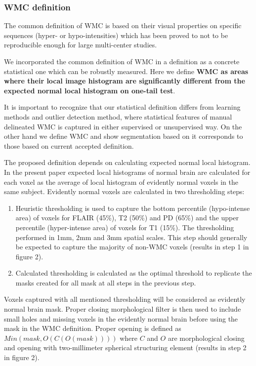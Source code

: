 \subsubsection{WMC definition}
The common definition of WMC is based on their visual properties on specific sequences (hyper- or hypo-intensities) which has been proved to not to be reproducible enough for large multi-center studies. 
\par
We incorporated the common definition of WMC in a definition as a concrete statistical one which can be robustly measured. Here we  define \textbf{WMC as areas where their local image histogram are significantly different from the expected normal local histogram on one-tail test}.
\par
It is important to recognize that our statistical definition differs from learning methods and outlier detection method, where statistical features of manual delineated WMC is captured in either supervised or unsupervised way.
On the other hand we define WMC and show segmentation based on it corresponds to those based on current accepted definition.
\par
The proposed definition depends on calculating expected normal local histogram. In the present paper expected local histograms of normal brain are calculated for each voxel as the average of local histogram of evidently normal voxels in the same subject. Evidently normal voxels are calculated in two thresholding steps:
\par
\begin{enumerate}
\item Heuristic thresholding is used to capture the bottom percentile (hypo-intense area) of voxels for FLAIR (45\%), T2 (50\%) and PD (65\%) and the upper percentile (hyper-intense area) of voxels for T1 (15\%). The thresholding performed in 1mm, 2mm and 3mm spatial scales. This step should generally be expected to capture the majority of non-WMC voxels (results in step 1 in figure 2).
\item Calculated thresholding is calculated as the optimal threshold \cite{ReduceSVM} to replicate the masks created for all mask at all steps in the previous step.
\end{enumerate}
\par
Voxels captured with all mentioned thresholding will be considered as evidently normal brain mask. Proper closing morphological filter is then used to include small holes and missing voxels in the evidently normal brain before using the mask in the WMC definition. Proper opening is defined as $ Min(mask,O( C( O( mask )))  ) $ where $ C $ and $ O $ are morphological closing and opening with two-millimeter spherical structuring element (results in step 2 in figure 2).
    
    
    
  
  
  
  
  
  
  
  
  
  
  